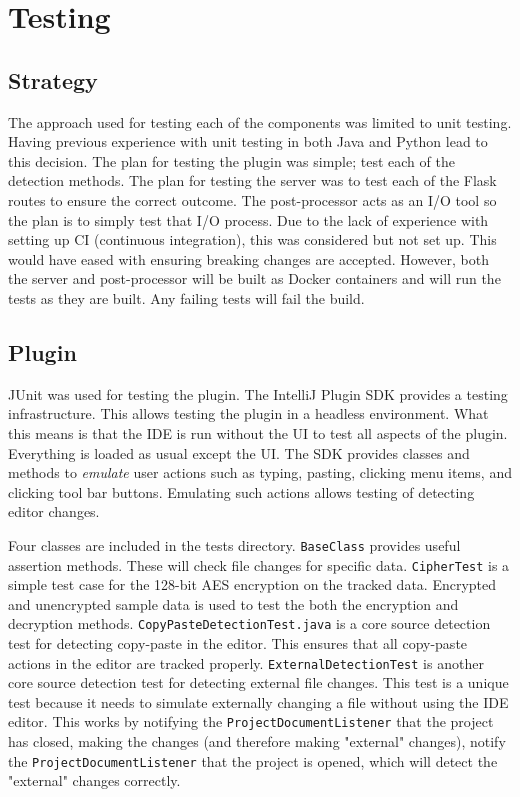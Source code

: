 \chapter{Testing}
\label{chp:testing}
\section{Strategy}
The approach used for testing each of the components was limited to unit testing. Having previous experience with unit testing in both Java and Python lead to this decision.  The plan for testing the plugin was simple; test each of the detection methods. The plan for testing the server was to test each of the Flask routes to ensure the correct outcome. The post-processor acts as an I/O tool so the plan is to simply test that I/O process. Due to the lack of experience with setting up CI (continuous integration), this was considered but not set up. This would have eased with ensuring breaking changes are accepted. However, both the server and post-processor will be built as Docker containers and will run the tests as they are built. Any failing tests will fail the build.

\section{Plugin}
JUnit was used for testing the plugin. The IntelliJ Plugin SDK provides a testing infrastructure. This allows testing the plugin in a headless environment. What this means is that the IDE is run without the UI to test all aspects of the plugin. Everything is loaded as usual except the UI. The SDK provides classes and methods to \textit{emulate} user actions such as typing, pasting, clicking menu items, and clicking tool bar buttons. Emulating such actions allows testing of detecting editor changes.

Four classes are included in the tests directory. \texttt{BaseClass} provides useful assertion methods. These will check file changes for specific data. \texttt{CipherTest} is a simple test case for the 128-bit AES encryption on the tracked data. Encrypted and unencrypted sample data is used to test the both the encryption and decryption methods. \texttt{CopyPasteDetectionTest.java} is a core source detection test for detecting copy-paste in the editor. This ensures that all copy-paste actions in the editor are tracked properly. \texttt{ExternalDetectionTest} is another core source detection test for detecting external file changes. This test is a unique test because it needs to simulate externally changing a file without using the IDE editor. This works by notifying the \texttt{ProjectDocumentListener} that the project has closed, making the changes (and therefore making "external" changes), notify the \texttt{ProjectDocumentListener} that the project is opened, which will detect the "external" changes correctly.

